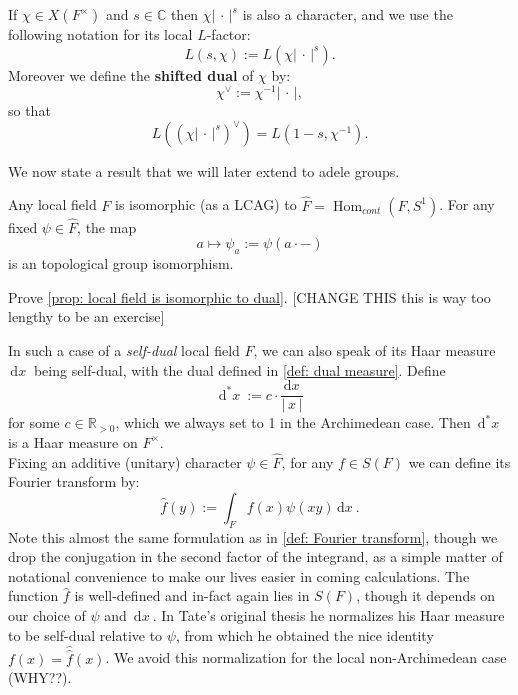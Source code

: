 \documentclass[11pt, x11names]{article}
\newcommand{\rr}{\mathbb{R}}
\newcommand{\cc}{\mathbb{C}}
\renewcommand{\brack}[1]{\left(   #1 \right)}
\newcommand{\abs}[1]{\left| \, #1  \,\right|}
\renewcommand{\hat}{\widehat}
\DeclareMathOperator{\Hom}{Hom}
\newcommand{\inv}[1]{#1^{-1}}
\newcommand{\dx}{\, \mathrm{d}x \ }
\renewcommand{\d}[1]{\, \mathrm{d}#1 \ }
\begin{document}
\begin{defn}
    If $\chi \in X(F^\times)$ and $s \in \cc$ then $\chi \abs{\cdot}^s$ is also a character, and we use the following notation for its local $L$-factor:
    \begin{equation*}
        L(s, \chi) := L(\chi \abs{\cdot}^s).
    \end{equation*}
    Moreover we define the \textbf{shifted dual} of $\chi$ by:
    \begin{equation*}
        \chi^\lor := \inv{\chi}\abs{\cdot},
    \end{equation*}
    so that
    \begin{equation*}
        L\brack{(\chi \abs{\cdot}^s)^\lor} = L\brack{1-s, \inv{\chi}}.
    \end{equation*}
\end{defn}

We now state a result that we will later extend to adele groups.
\begin{prop}
\label{prop: local field is isomorphic to dual}
Any local field $F$ is isomorphic (as a LCAG) to $\hat{F} = \Hom_{cont}(F, S^1)$. For any fixed $\psi \in \hat{F}$, the map
\begin{equation*}
    a \mapsto \psi_a := \psi(a \cdot  -)
\end{equation*}
is an topological group isomorphism.
\end{prop}
\begin{exercise}
    Prove \ref{prop: local field is isomorphic to dual}. [CHANGE THIS this is way too lengthy to be an exercise]
\end{exercise}

In such a case of a \textit{self-dual} local field $F$, we can also speak of its Haar measure $\dx$ being self-dual, with the dual defined in \ref{def: dual measure}. Define 
\begin{equation}
\label{eqn: measure on F^times}
    \d{^*x} := c \cdot \frac{\dx}{\abs{x}}
\end{equation}
for some $c \in \rr_{> 0}$, which we always set to 1 in the Archimedean case. Then $\d{^*x}$ is a Haar measure on $F^\times$.\\
Fixing an additive (unitary) character $\psi \in \hat{F}$, for any $f \in S(F)$ we can define its Fourier transform by:
\begin{equation}
\label{eqn: Fourier transform local-zeta-func}
    \hat{f}(y) := \int_F f(x)\psi(xy)\dx.
\end{equation}
Note this almost the same formulation as in \ref{def: Fourier transform}, though we drop the conjugation in the second factor of the integrand, as a simple matter of notational convenience to make our lives easier in coming calculations. The function $\hat{f}$ is well-defined and in-fact again lies in $S(F)$, though it depends on our choice of $\psi$ and $\dx$. In Tate's original thesis he normalizes his Haar measure to be self-dual relative to $\psi$, from which he obtained the nice identity $f(x) = \hat{\hat{f}}(x)$. We avoid this normalization for the local non-Archimedean case (WHY??).
\end{document}
